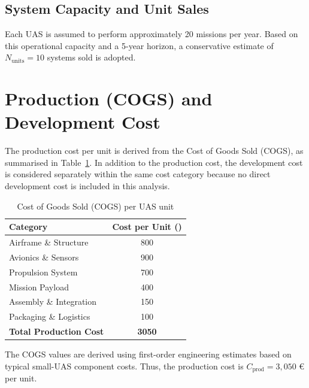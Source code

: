 \vspace{-10pt}
\subsection*{System Capacity and Unit Sales}

Each UAS is assumed to perform approximately 20 missions per year. Based on this operational capacity and a 5-year horizon, a conservative estimate of $N_{\text{units}} = 10$ systems sold is adopted.


\vspace{-15pt}

\section{Production (COGS) and Development Cost}
The production cost per unit is derived from the Cost of Goods Sold (COGS), as summarised in Table~\ref{tab:cogs}. In addition to the production cost, the development cost is considered separately within the same cost category because no direct development cost is included in this analysis.

\begin{table}[h]
\centering
\setlength{\tabcolsep}{4pt}
\renewcommand{\arraystretch}{0.9}
\caption{Cost of Goods Sold (COGS) per UAS unit}
\label{tab:cogs}
\begin{tabular}{lc}
\toprule
\textbf{Category} & \textbf{Cost per Unit (\texteuro{})} \\
\midrule
Airframe \& Structure & 800 \\
Avionics \& Sensors & 900 \\
Propulsion System & 700 \\
Mission Payload & 400 \\
Assembly \& Integration & 150 \\
Packaging \& Logistics & 100 \\
\midrule
\textbf{Total Production Cost} & \textbf{3050} \\
\bottomrule
\end{tabular}
\end{table}

The COGS values are derived using first-order engineering estimates based on typical small-UAS component costs. Thus, the production cost is $C_{\text{prod}} = 3{,}050 \text{ €}$ per unit.

